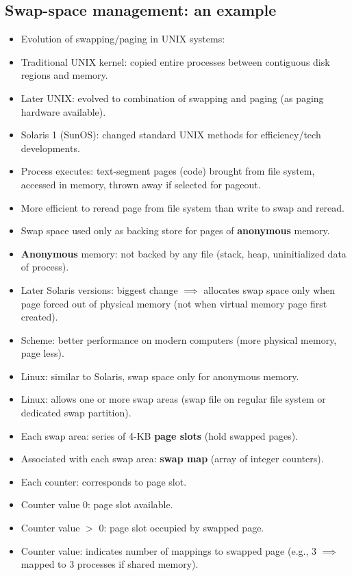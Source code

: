 \subsection{Swap-space management: an example}
\begin{itemize}
    \item Evolution of swapping/paging in UNIX systems:
    \item Traditional UNIX kernel: copied entire processes between contiguous disk regions and memory.
    \item Later UNIX: evolved to combination of swapping and paging (as paging hardware available).
    \item Solaris 1 (SunOS): changed standard UNIX methods for efficiency/tech developments.
    \item Process executes: text-segment pages (code) brought from file system, accessed in memory, thrown away if selected for pageout.
    \item More efficient to reread page from file system than write to swap and reread.
    \item Swap space used only as backing store for pages of \textbf{anonymous} memory.
    \item \textbf{Anonymous} memory: not backed by any file (stack, heap, uninitialized data of process).
    \item Later Solaris versions: biggest change $\implies$ allocates swap space only when page forced out of physical memory (not when virtual memory page first created).
    \item Scheme: better performance on modern computers (more physical memory, page less).
    \item Linux: similar to Solaris, swap space only for anonymous memory.
    \item Linux: allows one or more swap areas (swap file on regular file system or dedicated swap partition).
    \item Each swap area: series of 4-KB \textbf{page slots} (hold swapped pages).
    \item Associated with each swap area: \textbf{swap map} (array of integer counters).
    \item Each counter: corresponds to page slot.
    \item Counter value 0: page slot available.
    \item Counter value $>$ 0: page slot occupied by swapped page.
    \item Counter value: indicates number of mappings to swapped page (e.g., 3 $\implies$ mapped to 3 processes if shared memory).
\end{itemize}

